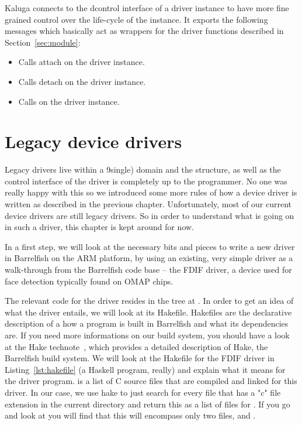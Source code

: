 \documentclass[a4paper,11pt,twoside]{report}
\begin{document}
Kaluga connects to the dcontrol interface of a driver instance to have more fine
grained control over the life-cycle of the instance. It exports the following
messages which basically act as wrappers for the driver functions described in
Section~\ref{sec:module}:
\begin{itemize}
    \item[\fnname{attach}] Calls attach on the driver instance.
    \item[\fnname{detach}] Calls detach on the driver instance.
    \item[\fnname{set\_sleep\_level}] Calls  on the driver instance.
\end{itemize}


\chapter{Legacy device drivers}
\label{chap:legacy}

Legacy drivers live within a 9single) domain and the structure, as well as the control
interface of the driver is completely up to the programmer. No one was really
happy with this so we introduced some more rules of how a device driver is
written as described in the previous chapter. Unfortunately, most of our current
device drivers are still legacy drivers. So in order to understand what is going
on in such a driver, this chapter is kept around for now.

In a first step, we will look at the necessary bits and pieces to write a new
driver in Barrelfish on the ARM platform, by using an existing, very simple
driver as a walk-through from the Barrelfish code base -- the FDIF driver, a
device used for face detection typically found on OMAP chips.

The relevant code for the driver resides in the tree at
. In order to get an idea of what the
driver entails, we will look at its Hakefile. Hakefiles are the declarative
description of a how a program is built in Barrelfish and what its
dependencies are. If you need more informations on our build system, you
should have a look at the Hake technote~\cite{btn003-hake}, which provides a
detailed description of Hake, the Barrelfish build system. We will look at the
Hakefile for the FDIF driver in Listing~\ref{lst:hakefile} (a Haskell program,
really) and explain what it means for the driver program.  is
a list of C source files that are compiled and linked for this driver. In our
case, we use hake to just search for every file that has a "c" file extension
in the current directory and return this as a list of files for
. If you go and look at 
you will find that this will encompass only two files,  and
.
\end{document}
